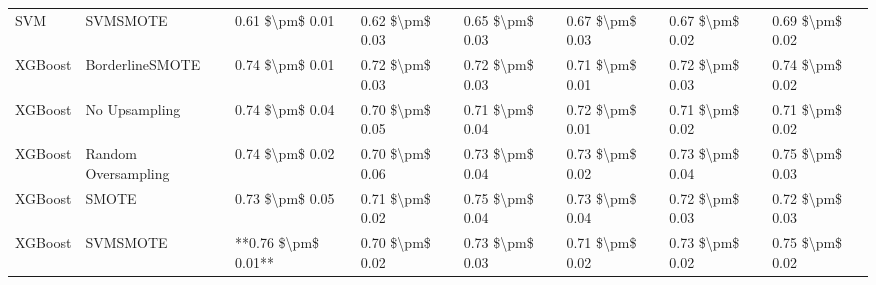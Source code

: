 \begin{tabular}{llllllll}
                            SVM &                      SVMSMOTE &     0.61 \$\textbackslash pm\$ 0.01 &           0.62 \$\textbackslash pm\$ 0.03 &       0.65 \$\textbackslash pm\$ 0.03 &        0.67 \$\textbackslash pm\$ 0.03 &                         0.67 \$\textbackslash pm\$ 0.02 &     0.69 \$\textbackslash pm\$ 0.02 \\
                        XGBoost &               BorderlineSMOTE &     0.74 \$\textbackslash pm\$ 0.01 &           0.72 \$\textbackslash pm\$ 0.03 &       0.72 \$\textbackslash pm\$ 0.03 &        0.71 \$\textbackslash pm\$ 0.01 &                         0.72 \$\textbackslash pm\$ 0.03 &     0.74 \$\textbackslash pm\$ 0.02 \\
                        XGBoost &                 No Upsampling &     0.74 \$\textbackslash pm\$ 0.04 &           0.70 \$\textbackslash pm\$ 0.05 &       0.71 \$\textbackslash pm\$ 0.04 &        0.72 \$\textbackslash pm\$ 0.01 &                         0.71 \$\textbackslash pm\$ 0.02 &     0.71 \$\textbackslash pm\$ 0.02 \\
                        XGBoost &           Random Oversampling &     0.74 \$\textbackslash pm\$ 0.02 &           0.70 \$\textbackslash pm\$ 0.06 &       0.73 \$\textbackslash pm\$ 0.04 &        0.73 \$\textbackslash pm\$ 0.02 &                         0.73 \$\textbackslash pm\$ 0.04 &     0.75 \$\textbackslash pm\$ 0.03 \\
                        XGBoost &                         SMOTE &     0.73 \$\textbackslash pm\$ 0.05 &           0.71 \$\textbackslash pm\$ 0.02 &       0.75 \$\textbackslash pm\$ 0.04 &        0.73 \$\textbackslash pm\$ 0.04 &                         0.72 \$\textbackslash pm\$ 0.03 &     0.72 \$\textbackslash pm\$ 0.03 \\
                        XGBoost &                      SVMSMOTE & **0.76 \$\textbackslash pm\$ 0.01** &           0.70 \$\textbackslash pm\$ 0.02 &       0.73 \$\textbackslash pm\$ 0.03 &        0.71 \$\textbackslash pm\$ 0.02 &                         0.73 \$\textbackslash pm\$ 0.02 &     0.75 \$\textbackslash pm\$ 0.02 \\
\bottomrule
\end{tabular}
